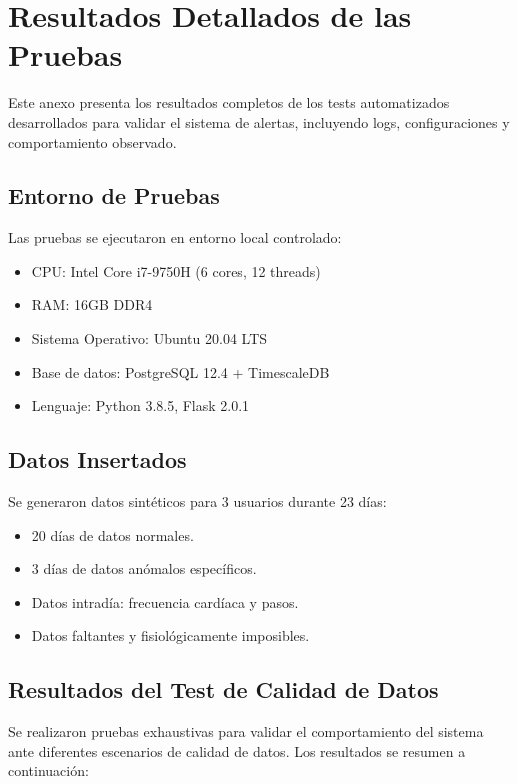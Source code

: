 \chapter{Resultados Detallados de las Pruebas}
\label{anexo:pruebas}

Este anexo presenta los resultados completos de los tests automatizados desarrollados para validar el sistema de alertas, incluyendo logs, configuraciones y comportamiento observado.

\section{Entorno de Pruebas}
\label{anexo:pruebas:entorno}

Las pruebas se ejecutaron en entorno local controlado:
\begin{itemize}
    \item CPU: Intel Core i7-9750H (6 cores, 12 threads)
    \item RAM: 16GB DDR4
    \item Sistema Operativo: Ubuntu 20.04 LTS
    \item Base de datos: PostgreSQL 12.4 + TimescaleDB
    \item Lenguaje: Python 3.8.5, Flask 2.0.1
\end{itemize}

\section{Datos Insertados}
\label{anexo:pruebas:insertados}

Se generaron datos sintéticos para 3 usuarios durante 23 días:

\begin{itemize}
    \item 20 días de datos normales.
    \item 3 días de datos anómalos específicos.
    \item Datos intradía: frecuencia cardíaca y pasos.
    \item Datos faltantes y fisiológicamente imposibles.
\end{itemize}

\section{Resultados del Test de Calidad de Datos}
\label{anexo:pruebas:calidad_datos}

Se realizaron pruebas exhaustivas para validar el comportamiento del sistema ante diferentes escenarios de calidad de datos. Los resultados se resumen a continuación:

